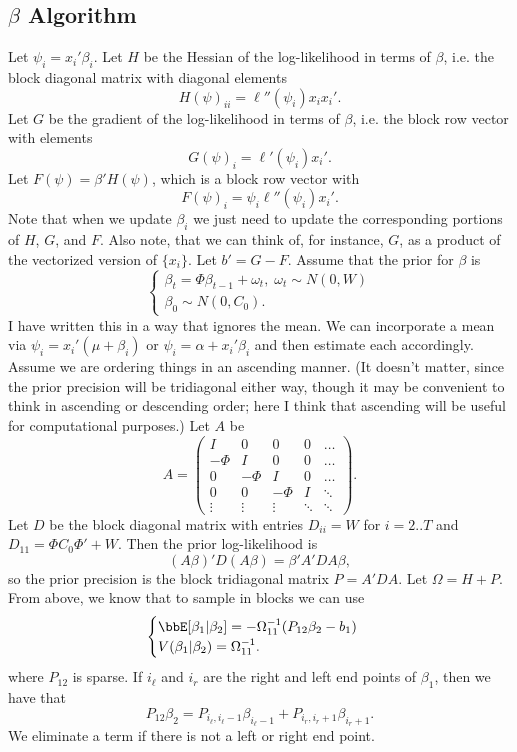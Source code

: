 \documentclass{article}
\begin{document}
\subsection{$\beta$ Algorithm}

Let $\psi_i = x_i' \beta_i$.  Let $H$ be the Hessian of the log-likelihood in
terms of $\beta$, i.e. the block diagonal matrix with diagonal elements
\[
H(\psi)_{ii} = \ell''(\psi_i) x_i x_i'.
\]
Let $G$ be the gradient of the log-likelihood in terms of $\beta$, i.e. the
block row vector with elements
\[
G(\psi)_i = \ell'(\psi_i) x_i'.
\]
Let $F(\psi) = \beta' H(\psi)$, which is a block row vector with
\[
F(\psi)_i = \psi_i \ell''(\psi_i) x_i'.
\]
Note that when we update $\beta_i$ we just need to update the corresponding
portions of $H$, $G$, and $F$.  Also note, that we can think of, for instance,
$G$, as a product of the vectorized version of $\{x_i\}$.  Let $b' = G - F$.
Assume that the prior for $\beta$ is
\[
\begin{cases}
\beta_t = \Phi \beta_{t-1} + \omega_t, \; \omega_t \sim N(0, W) \\
\beta_0 \sim N(0, C_0).
\end{cases}
\]
I have written this in a way that ignores the mean.  We can incorporate a mean
via $\psi_i = x_i' (\mu + \beta_i)$ or $\psi_i = \alpha + x_i' \beta_i$ and then
estimate each accordingly.  Assume we are ordering things in an ascending
manner.  (It doesn't matter, since the prior precision will be tridiagonal
either way, though it may be convenient to think in ascending or descending
order; here I think that ascending will be useful for computational purposes.)
Let $A$ be
\[
A =
\begin{pmatrix}
I & 0 & 0 & 0 & \ldots \\
-\Phi & I & 0 & 0 & \ldots \\
0 & -\Phi & I & 0 & \ldots \\
0 & 0 & -\Phi & I & \ddots \\
\vdots & \vdots & \vdots & \ddots & \ddots
\end{pmatrix}.
\]
Let $D$ be the block diagonal matrix with entries $D_{ii} = W$ for $i=2..T$ and
$D_{11} = \Phi C_0 \Phi' + W$.  Then the prior log-likelihood is
\[
(A \beta)' D (A \beta) = \beta' A'DA \beta,
\]
so the prior precision is the block tridiagonal matrix $P = A'DA$.  Let $\Omega
= H + P$.  From above, we know that to sample in blocks we can use
\[
\begin{cases}
\bbE[\beta_1 | \beta_2] = - \Omega_{11}^{-1} ( P_{12} \beta_2 - b_1) \\
V(\beta_1 | \beta_2) = \Omega_{11}^{-1}.
\end{cases}
\]
where $P_{12}$ is sparse.  If $i_\ell$ and $i_r$ are the right and left end
points of $\beta_1$, then we have that
\[
P_{12} \beta_2 = P_{i_\ell, i_\ell-1} \beta_{i_\ell-1}
+ P_{i_r,i_r+1} \beta_{i_r+1}.
\]
We eliminate a term if there is not a left or right end point.
\end{document}
